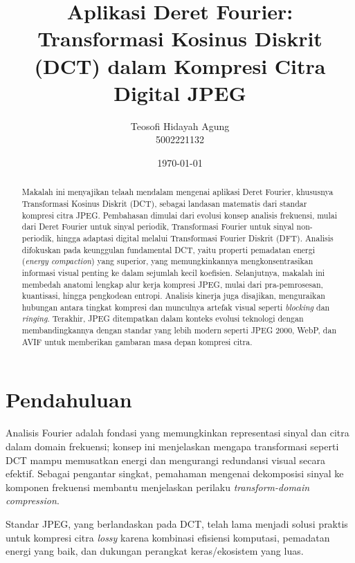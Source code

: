 \documentclass[a4paper]{article}
\title{\textbf{Aplikasi Deret Fourier: Transformasi Kosinus Diskrit (DCT) dalam Kompresi Citra Digital JPEG}}
\author{Teosofi Hidayah Agung\\5002221132}
\date{\today}
\newcommand{\keywords}[1]{%
  \begin{center}
  \textbf{\textit{Kata Kunci---}}#1
  \end{center}
}
\begin{document}
\maketitle

\begin{abstract}
  Makalah ini menyajikan telaah mendalam mengenai aplikasi Deret Fourier, khususnya Transformasi Kosinus Diskrit (DCT), sebagai landasan matematis dari standar kompresi citra JPEG. Pembahasan dimulai dari evolusi konsep analisis frekuensi, mulai dari Deret Fourier untuk sinyal periodik, Transformasi Fourier untuk sinyal non-periodik, hingga adaptasi digital melalui Transformasi Fourier Diskrit (DFT). Analisis difokuskan pada keunggulan fundamental DCT, yaitu properti pemadatan energi (\textit{energy compaction}) yang superior, yang memungkinkannya mengkonsentrasikan informasi visual penting ke dalam sejumlah kecil koefisien. Selanjutnya, makalah ini membedah anatomi lengkap alur kerja kompresi JPEG, mulai dari pra-pemrosesan, kuantisasi, hingga pengkodean entropi. Analisis kinerja juga disajikan, menguraikan hubungan antara tingkat kompresi dan munculnya artefak visual seperti \textit{blocking} dan \textit{ringing}. Terakhir, JPEG ditempatkan dalam konteks evolusi teknologi dengan membandingkannya dengan standar yang lebih modern seperti JPEG 2000, WebP, dan AVIF untuk memberikan gambaran masa depan kompresi citra.
\end{abstract}


\section{Pendahuluan}
Analisis Fourier adalah fondasi yang memungkinkan representasi sinyal dan citra dalam domain frekuensi; konsep ini menjelaskan mengapa transformasi seperti DCT mampu memusatkan energi dan mengurangi redundansi visual secara efektif. Sebagai pengantar singkat, pemahaman mengenai dekomposisi sinyal ke komponen frekuensi membantu menjelaskan perilaku \textit{transform-domain compression}.

Standar JPEG, yang berlandaskan pada DCT, telah lama menjadi solusi praktis untuk kompresi citra \textit{lossy} karena kombinasi efisiensi komputasi, pemadatan energi yang baik, dan dukungan perangkat keras/ekosistem yang luas.
\end{document}
